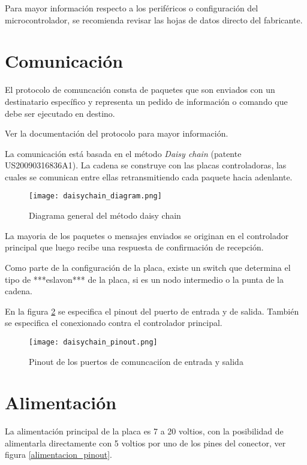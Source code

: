 \documentclass[a4paper,10pt]{article}
\begin{document}
Para mayor informaci\'on respecto a los perif\'ericos o configuraci\'on del microcontrolador, se recomienda revisar las hojas de datos directo del fabricante.

\section{Comunicaci\'on}
\label{comunicacion}
 
El protocolo de comuncaci\'on consta de paquetes que son enviados con un destinatario espec\'ifico
y representa un pedido de informaci\'on o comando que debe ser ejecutado en destino.

Ver la documentaci\'on del protocolo para mayor informaci\'on.

La comunicaci\'on est\'a basada en el m\'etodo \emph{Daisy chain} (patente US20090316836A1).
La cadena se construye con las placas controladoras, las cuales se comunican entre ellas retransmitiendo cada paquete hacia adenlante.

\begin{figure}
\centering
\texttt{[image: daisychain\_diagram.png]}
\caption{Diagrama general del m\'etodo daisy chain}
\label{daisychain_diagram}
\end{figure}

La mayoria de los paquetes o mensajes enviados se originan en el controlador principal que luego recibe una respuesta de confirmaci\'on de recepci\'on.

Como parte de la configuraci\'on de la placa, existe un switch que determina el tipo de ***eslavon*** de la placa, si es un nodo intermedio
o la punta de la cadena.

En la figura \ref{daisychain_pinout} se especifica el pinout del puerto de entrada y de salida.
Tambi\'en se especifica el conexionado contra el controlador principal.

\begin{figure}
\centering
\texttt{[image: daisychain\_pinout.png]}
\caption{Pinout de los puertos de comuncaci\'ion de entrada y salida}
\label{daisychain_pinout}
\end{figure}

\section{Alimentaci\'on}
\label{alimentacion}

La alimentaci\'on principal de la placa es 7 a 20 voltios, con la posibilidad de alimentarla directamente 
con 5 voltios por uno de los pines del conector, ver figura \ref{alimentacion_pinout}.
\end{document}
